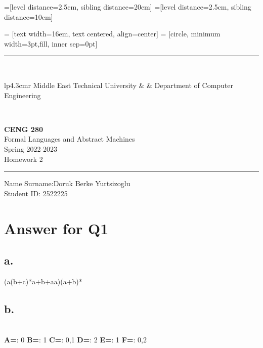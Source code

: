 \documentclass[12pt]{article}
\newcommand{\HRule}{\rule{\linewidth}{1mm}}
\begin{document}
=[level distance=2.5cm, sibling distance=20em]
=[level distance=2.5cm, sibling distance=10em]

 = [text width=16em, text centered, align=center]
 = [circle, minimum width=3pt,fill, inner sep=0pt]

\noindent
\HRule \\[3mm]
\small
\begin{tabular}[b]{lp{4.3cm}r}
Middle East Technical University &  &
Department of Computer Engineering \\
\end{tabular} \\
\begin{center}

                 \LARGE \textbf{CENG 280} \\[4mm]
                 \Large Formal Languages and Abstract Machines \\[4mm]
                \normalsize Spring 2022-2023 \\
                    \Large Homework 2 \\
\end{center}
\HRule



\begin{center}
Name Surname:Doruk Berke Yurtsizoglu   \\
Student ID: 2522225
\end{center}



\section*{Answer for Q1}

\subsection*{a.} 
(a(b+c)*a+b+aa)(a+b)*
 
\subsection*{b.}    \hfill\\
\textbf{A=}:   0     \newline
\textbf{B=}:   1     \newline
\textbf{C=}:   0,1     \newline
\textbf{D=}:   2     \newline
\textbf{E=}:   1     \newline
\textbf{F=}:   0,2     
\end{document}
